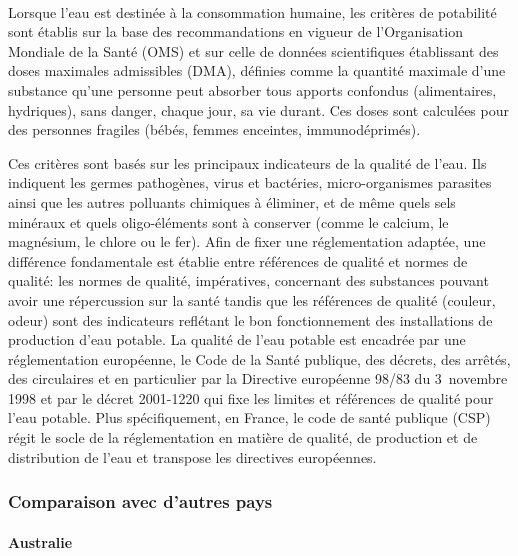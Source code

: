 \documentclass{article}
\begin{document}
\paragraph{} Lorsque l’eau est destinée à la consommation humaine, les critères de potabilité sont établis sur la base des recommandations en vigueur de l’Organisation Mondiale de la Santé (OMS) et sur celle de données scientifiques établissant des doses maximales admissibles (DMA), définies comme la quantité maximale d’une substance qu’une personne peut absorber tous apports confondus (alimentaires, hydriques), sans danger, chaque jour, sa vie durant. Ces doses sont calculées pour des personnes fragiles (bébés, femmes enceintes, immunodéprimés).

Ces critères sont basés sur les principaux indicateurs de la qualité de l’eau. Ils indiquent les  germes pathogènes, virus et bactéries, micro-organismes parasites ainsi que les autres polluants chimiques à éliminer, et de même quels sels minéraux et quels oligo-éléments sont à conserver (comme le calcium, le magnésium, le chlore ou le fer). Afin de fixer une réglementation adaptée, une différence fondamentale est établie entre références de qualité et normes de qualité: les normes de qualité, impératives, concernant des substances pouvant avoir une répercussion sur la santé tandis que les références de qualité (couleur, odeur) sont des indicateurs reflétant le bon fonctionnement des installations de production d’eau potable.
La qualité de l’eau potable est encadrée par une réglementation européenne, le Code de la Santé publique, des décrets, des arrêtés, des circulaires et en particulier par la Directive européenne 98/83 du 3~novembre 1998 et par le décret 2001-1220 qui fixe les limites et références de qualité pour l’eau potable. Plus spécifiquement, en France, le code de santé publique (CSP) régit le socle de la réglementation en matière de qualité, de production et de distribution de l’eau et transpose les directives européennes. 

\subsubsection{Comparaison avec d’autres pays}

\paragraph{Australie}
\end{document}
